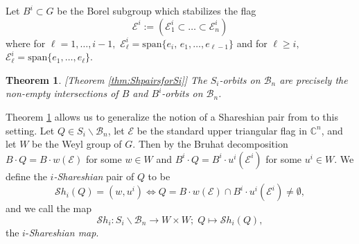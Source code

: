 \documentclass[12pt]{amsart}
\numberwithin{equation}{section}
\newtheorem{thm}{Theorem}[section]
\theoremstyle{remark}
\theoremstyle{definition}
\newcommand{\C}{\mbox{${\mathbb C}$}}
\newcommand{\B}{\mathcal{B}}
\newcommand{\Borbitspace}{B_{n-1}\backslash\B_{n}}
\newcommand{\Sh}{\mathcal{S}h}
\begin{document}
\noindent Let $B^{i}\subset G$ be the Borel subgroup which stabilizes the flag 
\begin{equation}\label{eq:introiflag}
\mathcal{E}^{i}:=(\mathcal{E}_{1}^{i}\subset \dots\subset \mathcal{E}_{n}^{i})
\end{equation} 
where for $\ell = 1, \dots, i-1,$  $\mathcal{E}_{\ell}^{i}=\mbox{span}\{e_{i}, \, e_{1},\dots, e_{\ell-1}\}$ and for $\ell \geq i,$  $\mathcal{E}_{\ell}^{i}=\mbox{span}\{e_{1},\dots, e_{\ell}\}.$
\begin{thm}\label{thm:introiSh}[Theorem \ref{thm:ShpairsforSi}]
The $S_{i}$-orbits on $\B_{n}$ are precisely the non-empty intersections of $B$ and $B^{i}$-orbits on $\B_{n}$.
\end{thm}
Theorem \ref{thm:introiSh} allows us to generalize the notion of a Shareshian pair from \cite{Shpairs} to this setting.  Let $Q\in S_{i}\backslash\B_{n}$, let $\mathcal{E}$ be the standard upper triangular flag in $\C^{n}$, and let $W$ be the Weyl group of $G.$  Then by the Bruhat decomposition $B\cdot Q=B\cdot w(\mathcal{E})$ for some $w\in W$ and $B^{i}\cdot Q=B^{i}\cdot u^{i}(\mathcal{E}^{i})$ for some $u^{i}\in W$.  
We define the \emph{$i$-Shareshian} pair of $Q$ to be 
\begin{equation}\label{eq:introiShpair}
\Sh_{i}(Q)=(w,u^{i})\Leftrightarrow Q=B\cdot w(\mathcal{E})\cap B^{i}\cdot u^{i}(\mathcal{E}^{i})\neq\emptyset,
\end{equation}
and we call the map 
\begin{equation}\label{eq:introiShmap}
\Sh_{i}: S_{i}\backslash\B_{n}\to W\times W; \; Q\mapsto \Sh_{i}(Q),
\end{equation}
the $i$-\emph{Shareshian map}.
\end{document}
